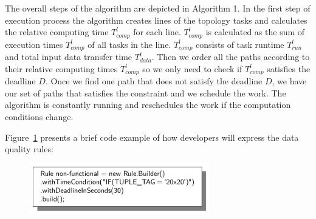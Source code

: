 The overall steps of the algorithm are depicted in Algorithm 1. In the first step of execution process the algorithm creates lines of the topology tasks and calculates the relative computing time $T_{comp}^l$ for each line. $T_{comp}^l$ is calculated as the sum of execution times $T_{comp}^l$ of all tasks in the line. $T_{comp}^l$ consists of task runtime $T_{run}^t$ and total input data transfer time $T_{data}^t$. Then we order all the paths according to their relative computing times $T_{comp}^l$ so we only need to check if $T_{comp}^l$ satisfies the deadline $D$. Once we find one path that does not satisfy the deadline $D$, we have our set of paths that satisfies the constraint and we schedule the work. The algorithm is constantly running and reschedules the work if the computation conditions change.

Figure~\ref{fig:qosRule} presents a brief code example of how developers will express the data quality rules:

\begin{figure}[h!]
  \centering
  \includegraphics[width=0.7\textwidth]{Figures/qosRule.pdf}
  \caption{}\label{fig:qosRule}
\end{figure}

